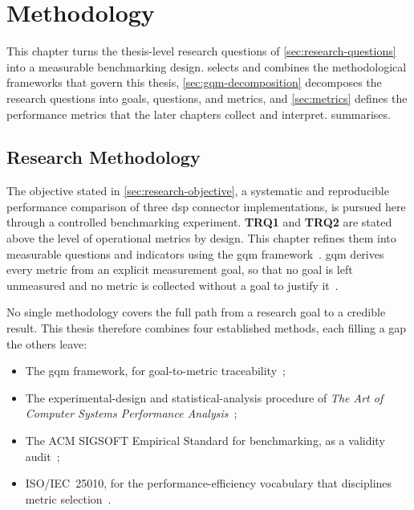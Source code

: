 \chapter{Methodology}\label{chap:methodology}

This chapter turns the thesis-level research questions of \cref{sec:research-questions} into a measurable benchmarking design.  selects and combines the methodological frameworks that govern this thesis, \cref{sec:gqm-decomposition} decomposes the research questions into goals, questions, and metrics, and \cref{sec:metrics} defines the performance metrics that the later chapters collect and interpret.  summarises.


\section{Research Methodology}\label{sec:research-methodology}

The objective stated in \cref{sec:research-objective}, a systematic and reproducible performance comparison of three \gls{dsp} connector implementations, is pursued here through a controlled benchmarking experiment. \textbf{TRQ1} and \textbf{TRQ2} are stated above the level of operational metrics by design. This chapter refines them into measurable questions and indicators using the \gls{gqm} framework~\citep{caldiera1994goal}. \Gls{gqm} derives every metric from an explicit measurement goal, so that no goal is left unmeasured and no metric is collected without a goal to justify it~\citep{minhas2023gqm}.

No single methodology covers the full path from a research goal to a credible result. This thesis therefore combines four established methods, each filling a gap the others leave:

\begin{itemize}[leftmargin=*, itemsep=2pt, topsep=4pt]
    \item The \gls{gqm} framework, for goal-to-metric traceability~\citep{caldiera1994goal};
    \item The experimental-design and statistical-analysis procedure of \emph{The Art of Computer Systems Performance Analysis}~\citep{jain1991art};
    \item The ACM SIGSOFT Empirical Standard for benchmarking, as a validity audit~\citep{Ralph2020, empiricalStandardsBenchmarking};
    \item ISO/IEC~25010, for the performance-efficiency vocabulary that disciplines metric selection~\citep{iso25010}.
\end{itemize}


